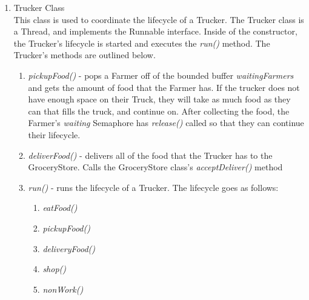 \documentclass[12pt]{article}
\begin{document}
\begin{enumerate}
            \item Trucker Class \\
            This class is used to coordinate the lifecycle of a Trucker. The Trucker class is a Thread, and implements the Runnable interface. Inside of the constructor, the Trucker's lifecycle is started and executes the \textit{run()} method. The Trucker's methods are outlined below.
            \begin{enumerate}
                \item \textit{pickupFood()} - pops a Farmer off of the bounded buffer \textit{waitingFarmers} and gets the amount of food that the Farmer has. If the trucker does not have enough space on their Truck, they will take as much food as they can that fills the truck, and continue on. After collecting the food, the Farmer's \textit{waiting} Semaphore has \textit{release()} called so that they can continue their lifecycle.
                \item \textit{deliverFood()} - delivers all of the food that the Trucker has to the GroceryStore. Calls the GroceryStore class's \textit{acceptDeliver()} method
                \item \textit{run()} - runs the lifecycle of a Trucker. The lifecycle goes as follows:
                \begin{enumerate}
                    \item \textit{eatFood()}
                    \item \textit{pickupFood()}
                    \item \textit{deliveryFood()}
                    \item \textit{shop()}
                    \item \textit{nonWork()}
                \end{enumerate}
            \end{enumerate}
        \end{enumerate}
        
        
\end{document}
